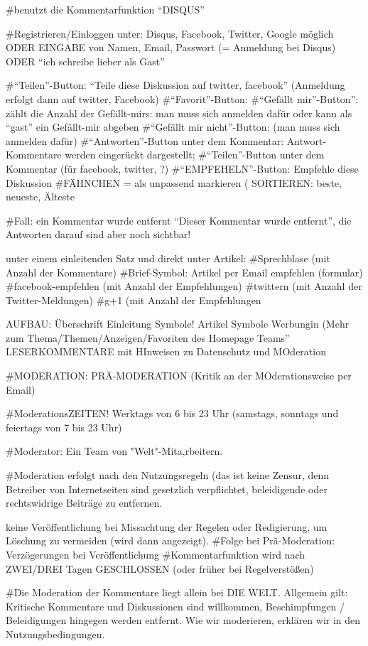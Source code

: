 #benutzt die Kommentarfunktion ``DISQUS''

#Registrieren/Einloggen unter: Disqus, Facebook, Twitter, Google möglich ODER EINGABE von Namen, Email, Passwort (= Anmeldung bei Disqus) ODER ``ich schreibe lieber als Gast''

#``Teilen''-Button: ``Teile diese Diskussion auf twitter, facebook'' (Anmeldung erfolgt dann auf twitter, Facebook)
#``Favorit''-Button: 
#``Gefällt mir''-Button'': zählt die Anzahl der Gefällt-mirs: man muss sich anmelden dafür oder kann als ``gast'' ein Gefällt-mir abgeben
#``Gefällt mir nicht''-Button: (man muss sich anmelden dafür)
#``Antworten''-Button unter dem Kommentar: Antwort-Kommentare werden eingerückt dargestellt; 
#``Teilen''-Button unter dem Kommentar (für facebook, twitter, ?)
#``EMPFEHELN''-Button: Empfehle diese Diskussion
#FÄHNCHEN = als unpassend markieren (
 SORTIEREN: beste, neueste, Älteste

#Fall: ein Kommentar wurde entfernt ``Dieser Kommentar wurde entfernt'', die Antworten darauf sind aber noch sichtbar!

unter einem einleitenden Satz und direkt unter Artikel:
#Sprechblase (mit Anzahl der Kommentare)
#Brief-Symbol: Artikel per Email empfehlen (formular)
#facebook-empfehlen (mit Anzahl der Empfehlungen)
#twittern (mit Anzahl der Twitter-Meldungen)
#g+1 (mit Anzahl der Empfehlungen


AUFBAU: 
Überschrift
Einleitung
Symbole!
Artikel
Symbole
Werbungin (Mehr zum Thema/Themen/Anzeigen/Favoriten des Homepage Teams''
LESERKOMMENTARE mit HInweisen zu Datenschutz und MOderation


#MODERATION: PRÄ-MODERATION (Kritik an der MOderationsweise per Email)

#ModerationsZEITEN! Werktags von 6 bis 23 Uhr (samstags, sonntags und feiertags von 7 bis 23 Uhr)

#Moderator: Ein Team von "Welt"-Mita‚rbeitern.

#Moderation erfolgt nach den Nutzungsregeln (das ist keine Zensur, denn Betreiber von Internetseiten sind gesetzlich verpflichtet, beleidigende oder rechtswidrige Beiträge zu entfernen.


keine Veröffentlichung bei Missachtung der Regelen oder Redigierung, um Löschung zu vermeiden (wird dann angezeigt).
#Folge bei Prä-Moderation: Verzögerungen bei Veröffentlichung
#Kommentarfunktion wird nach ZWEI/DREI Tagen GESCHLOSSEN (oder früher bei Regelverstößen)


#Die Moderation der Kommentare liegt allein bei DIE WELT. Allgemein gilt: Kritische Kommentare und Diskussionen sind willkommen, Beschimpfungen / Beleidigungen hingegen werden entfernt. Wie wir moderieren, erklären wir in den Nutzungsbedingungen. 


